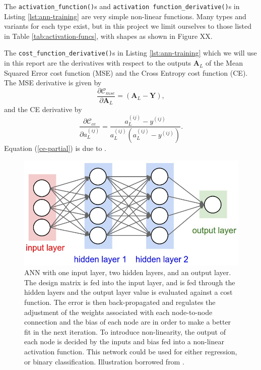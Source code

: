 \documentclass[]{article}
\begin{document}
\vspace{5mm}

The \lstinline|activation_function()|s and \lstinline|activation function_derivative()|s in Listing \ref{lst:ann-training} are very simple non-linear functions. Many types and variants for each type exist, but in this project we limit ourselves to those listed in Table \ref{tab:activation-funcs}, with shapes as shown in Figure XX.

The \lstinline|cost_function_derivative()|s in Listing \ref{lst:ann-training} which we will use in this report are the derivatives with respect to the outputs $\mathbf{A}_L$ of the Mean Squared Error cost function (MSE) and the Cross Entropy cost function (CE). The MSE derivative is given by
\begin{equation}
	\frac{\partial \mathcal{C}_{mse}}{\partial \mathbf{A}_L} = (\mathbf{A}_L - \mathbf{Y}),
\end{equation}
and the CE derivative by
\begin{equation} \label{ce-partial}
	\frac{\partial \mathcal{C}_{ce}}{\partial a_L^{(ij)}} = \frac{a_L^{(ij)} - y^{(ij)}}{a_L^{(ij)} (a_L^{(ij)} - y^{(ij)})}.
\end{equation}
Equation (\ref{ce-partial}) is due to \cite{fys-stk4155-notes}.



\begin{figure}[!htb]
	\centering
	\includegraphics[width=1\linewidth]{ann-illustration.jpeg}
	\caption{ANN with one input layer, two hidden layers, and an output layer. The design matrix is fed into the input layer, and is fed through the hidden layers and the output layer value is evaluated against a cost function. The error is then back-propagated and regulates the adjustment of the weights associated with each node-to-node connection and the bias of each node are in order to make a better fit in the next iteration. To introduce non-linearity, the output of each node is decided by the inputs and bias fed into a non-linear activation function. This network could be used for either regression, or binary classification. Illustration borrowed from \cite{fys-stk4155-notes}.}
	\label{fig:ann-illustration}
\end{figure}
\end{document}
